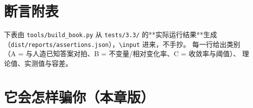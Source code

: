 \section{断言附表}
\label{sec:asserts}

下表由 \texttt{tools/build\_book.py} 从 \texttt{tests/3.3/} 的**实际运行结果**生成
（\texttt{dist/reports/assertions.json}），\texttt{\textbackslash input} 进来，不手抄。
每一行给出类别（A = 与人造已知答案对拍、B = 不变量/相对变化率、C = 收敛率与阈值）、
理论值、实测值与容差。



\section{它会怎样骗你（本章版）}
\label{sec:traps}

